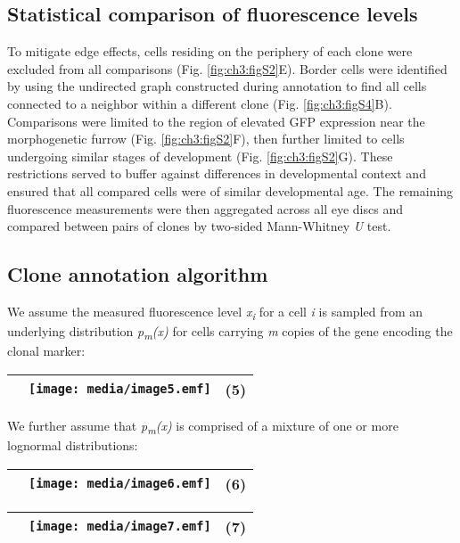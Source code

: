 \subsection{Statistical comparison of fluorescence levels}

To mitigate edge effects, cells residing on the periphery of each clone were excluded from all comparisons (Fig. \ref{fig:ch3:figS2}E). Border cells were identified by using the undirected graph constructed during annotation to find all cells connected to a neighbor within a different clone (Fig. \ref{fig:ch3:figS4}B). Comparisons were limited to the region of elevated GFP expression near the morphogenetic furrow (Fig. \ref{fig:ch3:figS2}F), then further limited to cells undergoing similar stages of development (Fig. \ref{fig:ch3:figS2}G). These restrictions served to buffer against differences in developmental context and ensured that all compared cells were of similar developmental age. The remaining fluorescence measurements were then aggregated across all eye discs and compared between pairs of clones by two-sided Mann-Whitney \emph{U} test.

\subsection{Clone annotation algorithm} \label{ch3:methods:annotation}

We assume the measured fluorescence level \emph{x\textsubscript{i}} for a cell \emph{i} is sampled from an underlying distribution \emph{p\textsubscript{m}(x)} for cells carrying \emph{m} copies of the gene encoding the clonal marker:

\begin{longtable}[]{@{}lll@{}}
\toprule
& \texttt{[image: media/image5.emf]} & (5)\tabularnewline
\bottomrule
\end{longtable}

We further assume that \emph{p\textsubscript{m}(x)} is comprised of a mixture of one or more lognormal distributions:

\begin{longtable}[]{@{}lll@{}}
\toprule
& \texttt{[image: media/image6.emf]} & (6)\tabularnewline
\bottomrule
\end{longtable}

\begin{longtable}[]{@{}lll@{}}
\toprule
& \texttt{[image: media/image7.emf]} & (7)\tabularnewline
\bottomrule
\end{longtable}

